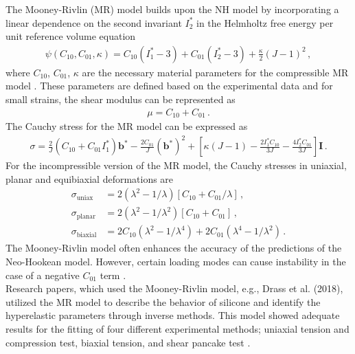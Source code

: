 The Mooney-Rivlin (MR) model builds upon the NH model by incorporating a linear dependence on the 
second invariant $I_2^*$ in the Helmholtz free energy per unit reference volume equation 
\begin{align}
        \psi(C_{10}, C_{01}, \kappa) = C_{10}(I_1^* - 3) + C_{01}(I_2^* - 3) + \frac{\kappa}{2}(J-1)^2 \, ,
        \label{eq:helmholtzMR}
\end{align}
where $C_{10}$, $C_{01}$, $\kappa$ are the necessary material parameters for the compressible MR model \cite{Bergström2015}.
These parameters are defined based on the experimental data and for small strains, the shear modulus can be represented as \cite{Youssef2022}
\begin{align}
        \mu = C_{10} + C_{01} \, .
        \label{eq:constantsMR}
\end{align}
The Cauchy stress for the MR model can be expressed as 
\begin{align}
        \sigma = \frac{2}{J}(C_{10} + C_{01}I_1^*)\boldsymbol{b}^* - \frac{2C_{01}}{J}(\boldsymbol{b}^*)^2 + [\kappa(J-1) - \frac{2I_1^* C_{10}}{3J} - \frac{4I_2^* C_{01}}{3J}]\boldsymbol{I} \, .
        \label{eq:cauchystressMR}
\end{align}
For the incompressible version of the MR model, the Cauchy stresses in uniaxial, planar and equibiaxial deformations are 
\begin{align}
        \sigma_{\text{uniax}} &= 2(\lambda^2 - 1/\lambda)[C_{10} + C_{01}/\lambda] \, , \label{eq:uniaxMR} \\
        \sigma_{\text{planar}} &= 2(\lambda^2 - 1/\lambda^2)[C_{10} + C_{01}] \, , \label{eq:planarMR} \\
        \sigma_{\text{biaxial}} &= 2C_{10}(\lambda^2 - 1/\lambda^4) + 2C_{01}(\lambda^4 - 1/\lambda^2) \, . \label{eq:biaxialMR}
\end{align}
The Mooney-Rivlin model often enhances the accuracy of the predictions of the Neo-Hookean model.
However, certain loading modes can cause instability in the case of a negative $C_{01}$ term \cite{Bergström2015}.\\

Research papers, which used the Mooney-Rivlin model, e.g., Drass et al. (2018), utilized the MR 
model to describe the behavior of silicone and identify the hyperelastic parameters through inverse methods. This model 
showed adequate results for the fitting of four different experimental methods; uniaxial tension and compression test, 
biaxial tension, and shear pancake test \cite{Drass2018}.


